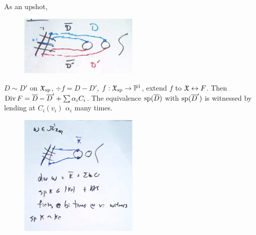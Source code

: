As an upshot,

	\begin{figure}[!ht]
	\centering
	\includegraphics[width=0.5\textwidth]{../images/im29.png}
	\end{figure}

$D \sim D'$ on $\mathfrak{X}_{\operatorname{sp}}$, $\div f= D - D'$, $f: \mathfrak{X}_{\operatorname{sp}} \to \mathbb{P}^1$, extend $f$ to $\mathfrak{X} \leftrightarrow F$. Then $\operatorname{Div} F= \overline{D} - \overline{D}' + \sum \alpha_i C_i$. The equivalence $\operatorname{sp}(\overline{D})$ with $\operatorname{sp}(\overline{D}')$ is witnessed by lending at $C_i(v_i)$ $\alpha_i$ many times. 


	\begin{figure}[!ht]
	\centering
	\includegraphics[width=0.5\textwidth]{../images/im30.png}
	\end{figure}




























